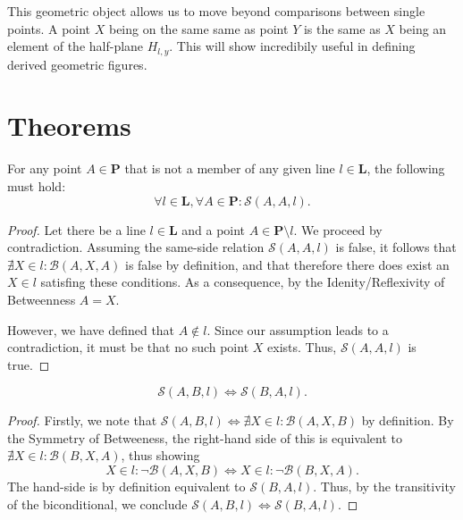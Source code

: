 \documentclass[../../../main/main.tex]{subfiles}
\begin{document}
This geometric object allows us to move beyond comparisons between single points. A point $X$ being on the same same as point $Y$ is the same as $X$ being an element of the half-plane $H_{l,y}$. This will show incredibily useful in defining derived geometric figures.

\section{Theorems}

\begin{theorem}
    For any point $A \in \mathbf{P}$ that is not a member of any given line $l \in \mathbf{L}$, the following must hold:
    \[
    \forall l \in \mathbf{L}, \forall A \in \mathbf{P} \colon \mathcal{S}(A, A, l).
    \]
\end{theorem}
\begin{proof}
    Let there be a line $l \in \mathbf{L}$ and a point $A \in \mathbf{P} \setminus l$. We proceed by contradiction. Assuming the same-side relation $\mathcal{S}(A, A, l)$ is false, it follows that $\nexists X \in l \colon \mathcal{B}(A, X, A)$ is false by definition, and that therefore there does exist an $X \in l$ satisfing these conditions. As a consequence, by the Idenity/Reflexivity of Betweenness $A = X$.

    However, we have defined that $A \notin l$. Since our assumption leads to a contradiction, it must be that no such point $X$ exists. Thus, $\mathcal{S}(A, A, l)$ is true.
\end{proof}

\begin{theorem}
    \[
    \mathcal{S}(A, B, l) \iff \mathcal{S}(B, A, l).
    \]
\end{theorem}
\begin{proof}
    Firstly, we note that $\mathcal{S}(A, B, l) \iff \nexists X \in l \colon \mathcal{B}(A, X, B)$ by definition. By the Symmetry of Betweeness, the right-hand side of this is equivalent to $\nexists X \in l \colon \mathcal{B}(B, X, A)$, thus showing
    \[
    X \in l \colon \neg \mathcal{B}(A, X, B) \iff X \in l \colon \neg \mathcal{B}(B, X, A).
    \]
    The hand-side is by definition equivalent to $\mathcal{S}(B, A, l)$. Thus, by the transitivity of the biconditional, we conclude $\mathcal{S}(A, B, l) \iff \mathcal{S}(B, A, l)$.
\end{proof}
\end{document}

